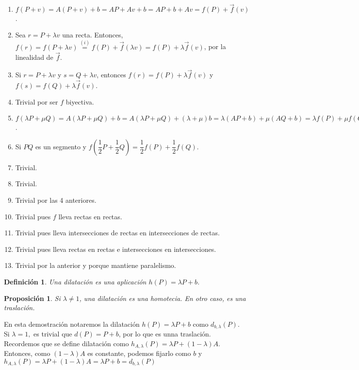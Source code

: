 \documentclass[11pt, a4paper]{article}
\makeatletter
\newif\IfInSansMode
\let\oldsf\sffamily
\renewcommand*{\sffamily}{\oldsf\mathversion{sans}\InSansModetrue}
\let\oldnorm\normalfont
\renewcommand*{\normalfont}{\oldnorm\InSansModefalse\mathversion{normal}}
\renewenvironment{proof}[1][\proofname] {\vspace{-15pt}\par\pushQED{\qed}\normalfont\topsep6\p@\@plus6\p@\relax\trivlist\item[\hskip\labelsep\it#1\@addpunct{.}]\ignorespaces}{\popQED\endtrivlist\@endpefalse}
\renewcommand{\vec}{\overrightarrow}
\renewenvironment{proof}[1][\proofname] {\par\pushQED{\qed}\normalfont\topsep6\p@\@plus6\p@\relax\trivlist\item[\hskip\labelsep\itshape\sffamily#1\@addpunct{.}]\ignorespaces}{\popQED\endtrivlist\@endpefalse}
\theoremstyle{theorem-style}
\newtheorem{nprop}{Proposición}[section]
\theoremstyle{definition-style}
\newtheorem{ndef}{Definición}[section]
\theoremstyle{remark-style}
\newtheorem*{nota}{Nota}
\theoremstyle{example-style}
\newenvironment{nlist}
{\begin{enumerate}
    \renewcommand\labelenumi{(\emph{\roman{enumi})}}}
  {\end{enumerate}}
\makeatother
\begin{document}
\begin{proof}\hfill
  \begin{nlist}
  \item $f(P+v) = A(P+v) + b = AP + Av + b = AP + b + Av = f(P) + \vec{f}(v)$.
  \item Sea $r = P + \lambda v$ una recta. Entonces, $f(r) = f(P + \lambda v) \overset{(i)}{=} f(P) + \vec{f}(\lambda v) = f(P) + \lambda \vec{f}(v)$, por la linealidad de $\vec{f}$.
  \item Si $r = P + \lambda v$ y $s = Q + \lambda v$, entonces $f(r) = f(P) + \lambda \vec{f}(v)$ y $f(s) = f(Q) + \lambda \vec{f}(v)$.
  \item Trivial por ser $f$ biyectiva.
  \item $f(\lambda P + \mu Q) = A(\lambda P + \mu Q) + b =A(\lambda P + \mu Q) + (\lambda + \mu)b = \lambda (AP + b) + \mu (AQ + b) = \lambda f(P) + \mu f(Q)$.
  \item Si $PQ$ es un segmento y $f(\dfrac{1}{2}P + \dfrac{1}{2}Q) = \dfrac{1}{2}f(P) +  \dfrac{1}{2}f(Q)$.
  \item Trivial.
  \item Trivial.
  \item Trivial por las 4 anteriores.
  \item Trivial pues $f$ lleva rectas en rectas.
  \item Trivial pues lleva intersecciones de rectas en intersecciones de rectas.
  \item Trivial pues lleva rectas en rectas e intersecciones en intersecciones.
  \item Trivial por la anterior y porque mantiene paralelismo.

    
  \end{nlist}
\end{proof}


\begin{ndef}
	Una dilatación es una aplicación $h(P) = \lambda P + b$. 
\end{ndef}

\begin{nprop} 
Si $\lambda \ne 1$, una dilatación es una homotecia. En otro caso, es una traslación. 
	
\end{nprop}

\begin{proof}
	En esta demostración notaremos la dilatación $h(P) = \lambda P + b$ como $d_{b,\lambda}(P)$.\\
	Si $\lambda = 1,$ es trivial que $d(P) = P + b$, por lo que es unna traslación.\\
	Recordemos que se define dilatación como $h_{A,\lambda}(P) = \lambda P + (1-\lambda)A $. Entonces, como $ (1-\lambda)A $ es constante, podemos fijarlo como $b$ y $h_{A,\lambda} (P)= \lambda P + (1-\lambda)A  = \lambda P + b  = d_{b,\lambda} (P) $
\end{proof}
\end{document}
